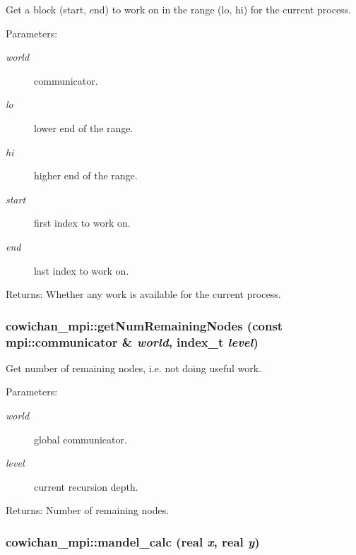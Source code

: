 Get a block (start, end) to work on in the range (lo, hi) for the current process. \begin{Desc}
\item[Parameters:]
\begin{description}
\item[{\em world}]communicator. \item[{\em lo}]lower end of the range. \item[{\em hi}]higher end of the range. \item[{\em start}]first index to work on. \item[{\em end}]last index to work on. \end{description}
\end{Desc}
\begin{Desc}
\item[Returns:]Whether any work is available for the current process. \end{Desc}
\hypertarget{namespacecowichan__mpi_7f82c459ad086060228b2bd8100bf9c7}{
\subsubsection[{getNumRemainingNodes}]{ cowichan\_\-mpi::getNumRemainingNodes (const mpi::communicator \& {\em world}, \/  {\bf index\_\-t} {\em level})}}
\label{namespacecowichan__mpi_7f82c459ad086060228b2bd8100bf9c7}


Get number of remaining nodes, i.e. not doing useful work. \begin{Desc}
\item[Parameters:]
\begin{description}
\item[{\em world}]global communicator. \item[{\em level}]current recursion depth. \end{description}
\end{Desc}
\begin{Desc}
\item[Returns:]Number of remaining nodes. \end{Desc}
\hypertarget{namespacecowichan__mpi_a2af23c28ab53e0577f4332936467475}{
\subsubsection[{mandel\_\-calc}]{ cowichan\_\-mpi::mandel\_\-calc ({\bf real} {\em x}, \/  {\bf real} {\em y})}}
\label{namespacecowichan__mpi_a2af23c28ab53e0577f4332936467475}


